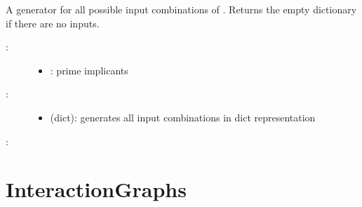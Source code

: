 \documentclass[letterpaper,10pt,english]{sphinxmanual}
\begin{document}
\begin{fulllineitems}
\label{\detokenize{PrimeImplicants:PyBoolNet.PrimeImplicants.input_combinations}}
A generator for all possible input combinations of .
Returns the empty dictionary if there are no inputs.
\begin{description}
\item[{:}] \leavevmode\begin{itemize}
\item {} 
: prime implicants

\end{itemize}

\item[{:}] \leavevmode\begin{itemize}
\item {} 
 (dict): generates all input combinations in dict representation

\end{itemize}

\end{description}

:

\begin{sphinxVerbatim}[commandchars=\\\{\}]
   
    
\end{sphinxVerbatim}

\end{fulllineitems}



\section{InteractionGraphs}
\label{\detokenize{InteractionGraphs::doc}}\label{\detokenize{InteractionGraphs:interactiongraphs}}\label{\detokenize{InteractionGraphs:id1}}
\end{document}
